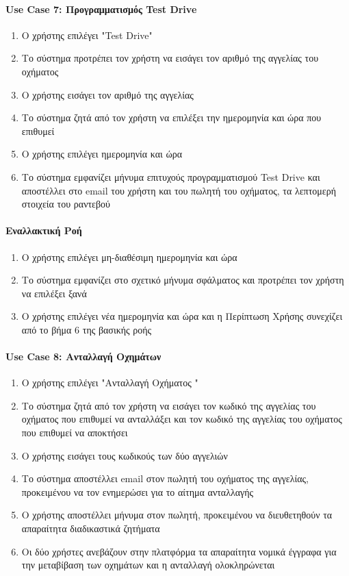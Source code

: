 \documentclass{../ol-softwaremanual}
\begin{document}
	\paragraph{\en Use Case 7: \gr Προγραμματισμός \en Test Drive \gr}
	
	\begin{enumerate}
		\item Ο χρήστης επιλέγει \en"Test Drive"\gr
		\item Το σύστημα προτρέπει τον χρήστη να εισάγει τον αριθμό της αγγελίας του οχήματος
		\item Ο χρήστης εισάγει τον αριθμό της αγγελίας
		\item Το σύστημα ζητά από τον χρήστη να επιλέξει την ημερομηνία και ώρα που επιθυμεί 
		\item Ο χρήστης επιλέγει ημερομηνία και ώρα
		\item Το σύστημα εμφανίζει μήνυμα επιτυχούς προγραμματισμού \en Test Drive \gr και αποστέλλει στο \en email \gr του χρήστη και του πωλητή του οχήματος, τα λεπτομερή στοιχεία του ραντεβού 
	\end{enumerate}

	\paragraph{Εναλλακτική Ροή}
	
	\begin{enumerate}
		\item Ο χρήστης επιλέγει μη-διαθέσιμη ημερομηνία και ώρα
		\item Το σύστημα εμφανίζει στο σχετικό μήνυμα σφάλματος και προτρέπει τον χρήστη να επιλέξει ξανά
		\item Ο χρήστης επιλέγει νέα ημερομηνία και ώρα και η Περίπτωση Χρήσης συνεχίζει από το βήμα 6 της βασικής ροής
	\end{enumerate}


   \paragraph{\en Use Case 8: \gr  Ανταλλαγή Οχημάτων \gr}
   
   \begin{enumerate}
   	\item Ο χρήστης επιλέγει \en"\gr Ανταλλαγή Οχήματος \en"\gr 
   	\item Το σύστημα ζητά από τον χρήστη να εισάγει τον κωδικό της αγγελίας του οχήματος που επιθυμεί να ανταλλάξει και τον κωδικό της αγγελίας του οχήματος που επιθυμεί να αποκτήσει 
   	\item Ο χρήστης εισάγει τους κωδικούς των δύο αγγελιών 	
   	\item Το σύστημα αποστέλλει \en email \gr στον πωλητή του οχήματος της αγγελίας, προκειμένου να τον ενημερώσει για το αίτημα ανταλλαγής
   	\item Ο χρήστης αποστέλλει μήνυμα στον πωλητή, προκειμένου να διευθετηθούν τα απαραίτητα διαδικαστικά ζητήματα 
   	\item Οι δύο χρήστες ανεβάζουν στην πλατφόρμα τα απαραίτητα νομικά έγγραφα για την μεταβίβαση των οχημάτων και η ανταλλαγή ολοκληρώνεται
   \end{enumerate}
   
\end{document}

